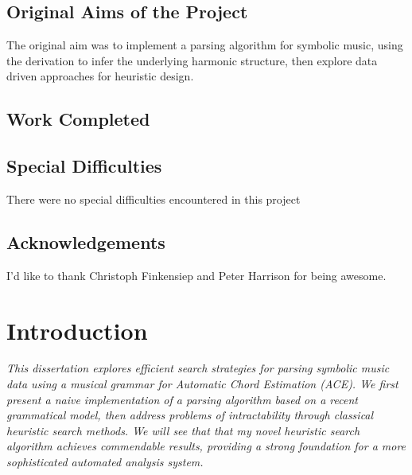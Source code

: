 \documentclass[12pt,a4paper,twoside,openright]{report}
\renewcommand{\baselinestretch}{1.1}    %
\theoremstyle{definition}
\begin{document}

\section*{Original Aims of the Project}
The original aim was to implement a parsing algorithm for symbolic music, using the derivation to infer the underlying harmonic structure, then explore data driven approaches for heuristic design.


\section*{Work Completed}



\section*{Special Difficulties}
There were no special difficulties encountered in this project

\newpage
{
\renewcommand{\baselinestretch}{0.75}\normalsize
\tableofcontents
\renewcommand{\baselinestretch}{1.0}\normalsize
}
\listoffigures

\newpage
\section*{Acknowledgements}
I'd like to thank Christoph Finkensiep and Peter Harrison for being awesome.




\pagestyle{headings}

\chapter{Introduction}
\textit{This dissertation explores efficient search strategies for parsing symbolic music data using a musical grammar for Automatic Chord Estimation (ACE). We first present a naive implementation of a parsing algorithm based on a recent grammatical model, then address problems of intractability through classical heuristic search methods. We will see that that my novel heuristic search algorithm achieves commendable results, providing a strong foundation for a more sophisticated automated analysis system. }
\end{document}
